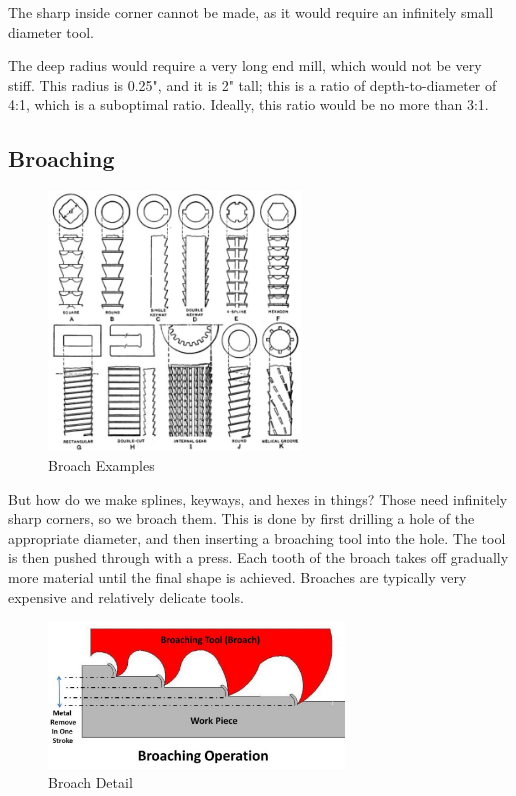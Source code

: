 \documentclass[10pt,letterpaper]{book}
\begin{document}
 \begin{asparaenum}[a)]
 	\item The sharp inside corner cannot be made, as it would require an infinitely small diameter tool.
 	\item The deep radius would require a very long end mill, which would not be very stiff. This radius is 0.25", and it is 2" tall; this is a ratio of depth-to-diameter of 4:1, which is a suboptimal ratio. Ideally, this ratio would be no more than 3:1.
 \end{asparaenum}
 
 \subsection{Broaching}
 
 
 \begin{figure}[H]
 	\includegraphics[width=0.6\textwidth]{imgs/broach_examples.jpeg}
 	\caption{Broach Examples}
 \end{figure}
 
 But how do we make splines, keyways, and hexes in things? Those need infinitely sharp corners, so we broach them. This is done by first drilling a hole of the appropriate diameter, and then inserting a broaching tool into the hole. The tool is then pushed through with a press. Each tooth of the broach takes off gradually more material until the final shape is achieved. Broaches are typically very expensive and relatively delicate tools.
 
 \begin{figure}[H]
 	\includegraphics[width=0.7\textwidth]{imgs/broach_detail.jpeg}
 	\caption{Broach Detail}
 \end{figure}
 
\end{document}

